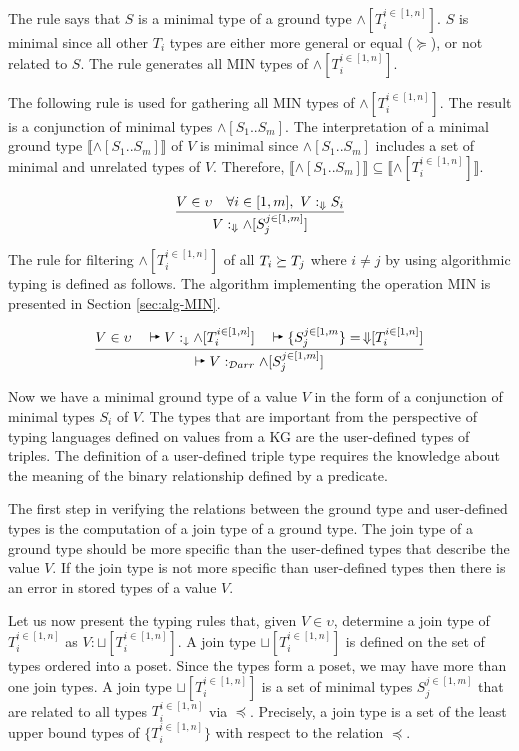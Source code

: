 \documentclass[runningheads]{llncs}
\newcommand{\darr}{\downarrow}
\newcommand{\Darr}{\Downarrow}
\newcommand{\vdasharr}{%
    \mathrel{%
        \vdash\hspace*{-5pt}%
        \raisebox{2.3pt}{\scalebox{.5}{\(\blacktriangleright\)}}%
    }%
}\newcommand{\D}{{\cal D}}
\begin{document}
The rule says that $S$ is a minimal type of a ground type
$\land[T_i^{i\in[1,n]}]$. $S$ is minimal since all other $T_i$ types are
either more general or equal ($\succeq$), or not related to $S$. The
rule generates all MIN types of $\land[T_i^{i\in[1,n]}]$.

The following rule is used for gathering all MIN types of
$\land[T_i^{i\in[1,n]}]$. The result is a conjunction of minimal types
$\land[S_1..S_m]$. The interpretation of a minimal ground type
$\llbracket\land[S_1..S_m]\rrbracket$ of $V$ is minimal since
$\land[S_1..S_m]$ includes a set of minimal and unrelated types of
$V$. Therefore,
$\llbracket\land[S_1..S_m]\rrbracket\subseteq\llbracket\land[T_i^{i\in[1,n]}]\rrbracket$.

\begin{equation}
\label{rul:min-gather}
\dfrac{V\in\upsilon\quad\forall\/i\in[1,m],\ V:_\Darr\/S_i}
      {V:_{\Darr}\land[S_j^{j\in[1,m]}]}
\end{equation}


The rule for filtering $\land[T_i^{i\in[1,n]}]$ of all
$T_i\succeq\/T_j$ where $i\not=j$ by using algorithmic typing is
defined as follows. The algorithm implementing the operation MIN is
presented in Section \ref{sec:alg-MIN}.

\begin{equation}
\label{rul:alg-min}
\dfrac{V\in\upsilon\quad\vdasharr\/V:_\darr\land[T_i^{i\in[1,n]}]\quad\vdasharr\/\{S_j^{j\in[1,m}\}=\,\Darr\kern -3pt[T_i^{i\in[1,n]}]}
{\vdasharr\/V:_{\D
    arr}\land\/[S_j^{j\in[1,m]}]}
\end{equation}

Now we have a minimal ground type of a value $V$ in the form of a
conjunction of minimal types $S_i$ of $V$. The types that are
important from the perspective of typing languages defined on values
from a KG are the user-defined types of triples. The definition of a
user-defined triple type requires the knowledge about the meaning of
the binary relationship defined by a predicate.

The first step in verifying the relations between the ground type and
user-defined types is the computation of a join type of a ground
type. The join type of a ground type should be more specific than the
user-defined types that describe the value $V$. If the join type is
not more specific than user-defined types then there is an error in
stored types of a value $V$.

Let us now present the typing rules that, given $V\in\upsilon$,
determine a join type of $T_i^{i\in[1,n]}$ as
$V:\sqcup[T_i^{i\in[1,n]}]$. A join type $\sqcup[T_i^{i\in[1,n]}]$ is
defined on the set of types ordered into a poset. Since the types form
a poset, we may have more than one join types. A join type
$\sqcup[T_i^{i\in[1,n]}]$ is a set of minimal types $S_j^{j\in[1,m]}$
that are related to all types $T_i^{i\in[1,n]}$ via
$\preceq$. Precisely, a join type is a set of the least upper bound
types of $\{T_i^{i\in[1,n]}\}$ with respect to the relation $\preceq$.
\end{document}
